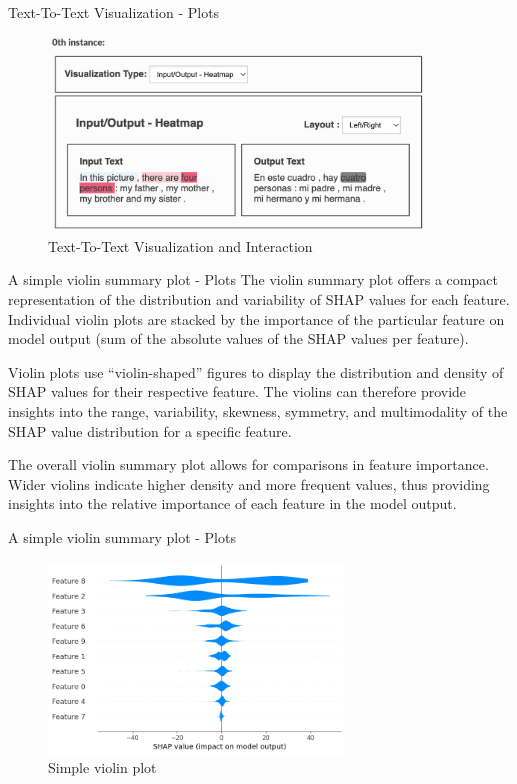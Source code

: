 \documentclass[aspectratio=169]{beamer}
\begin{document}
\begin{frame}{Text-To-Text Visualization - Plots}
    \begin{figure}[htbp]
        \centering
        \includegraphics[width=0.9\textwidth]{figs/shap/plots/text/text-to-text-2.png}
        \caption{Text-To-Text Visualization and Interaction}
        \label{fig:text-to-text-view-int}
    \end{figure}
\end{frame}

\begin{frame}{A simple violin summary plot - Plots}
    The violin summary plot offers a compact representation of the distribution and variability of \ac{SHAP} values for each feature. Individual violin plots are stacked by the importance of the particular feature on model output (sum of the absolute values of the \ac{SHAP} values per feature).
    
    Violin plots use “violin-shaped” figures to display the distribution and density of \ac{SHAP} values for their respective feature. The violins can therefore provide insights into the range, variability, skewness, symmetry, and multimodality of the \ac{SHAP} value distribution for a specific feature.
    
    The overall violin summary plot allows for comparisons in feature importance. Wider violins indicate higher density and more frequent values, thus providing insights into the relative importance of each feature in the model output.
\end{frame}

\begin{frame}{A simple violin summary plot - Plots}

    \begin{figure}[htbp]
        \centering
        \includegraphics[width=0.7\textwidth]{figs/shap/plots/violin/example_notebooks_api_examples_plots_violin_3_0.png}
        \caption{Simple violin plot}
        \label{fig:simple-violin-plot}
    \end{figure}
\end{frame}
\end{document}
